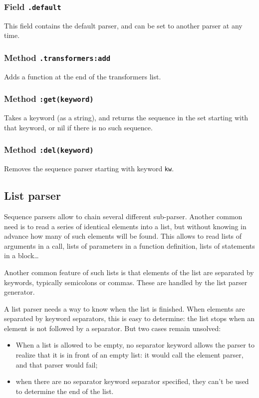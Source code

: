 \subsubsection{Field {\tt .default}}
This field contains the default parser, and can be set to another
parser at any time.

\subsubsection{Method {\tt .transformers:add}}
Adds a function at the end of the transformers list.

\subsubsection{Method {\tt :get(keyword)}}
Takes a keyword (as a string), and returns the sequence in the set
starting with that keyword, or nil if there is no such sequence.

\subsubsection{Method {\tt :del(keyword)}}
Removes the sequence parser starting with keyword {\tt kw}.

\subsection{List parser}

Sequence parsers allow to chain several different sub-parser. Another
common need is to read a series of identical elements into a list, but
without knowing in advance how many of such elements will be
found. This allows to read lists of arguments in a call, lists of
parameters in a function definition, lists of statements in a
block\ldots

Another common feature of such lists is that elements of the list are
separated by keywords, typically semicolons or commas. These are
handled by the list parser generator.

A list parser needs a way to know when the list is finished. When
elements are separated by keyword separators, this is easy to
determine: the list stops when an element is not followed by a
separator. But two cases remain unsolved:
\begin{itemize}
\item When a list is allowed to be empty, no separator keyword allows
  the parser to realize that it is in front of an empty list: it would
  call the element parser, and that parser would fail;
\item when there are no separator keyword separator specified, they
  can't be used to determine the end of the list.
\end{itemize}

